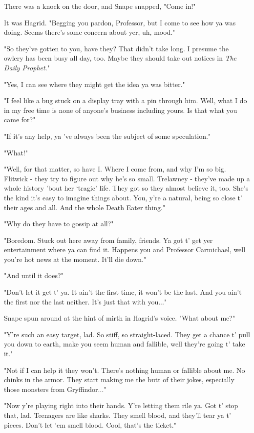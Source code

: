 \documentclass[a4paper,11pt]{article}
\begin{document}
There was a knock on the door, and Snape snapped, "Come in!"

It was Hagrid. "Begging you pardon, Professor, but I come to see how ya was doing. Seems there's some concern about yer, uh, mood."

"So they've gotten to you, have they? That didn't take long. I presume the owlery has been busy all day, too. Maybe they should take out notices in \emph{The Daily Prophet}."

"Yes, I can see where they might get the idea ya was bitter."

"I feel like a bug stuck on a display tray with a pin through him. Well, what I do in my free time is none of anyone's business including yours. Is that what you came for?"

"If it's any help, ya 've always been the subject of some speculation."

"What!"

"Well, for that matter, so have I. Where I come from, and why I'm so big. Flitwick - they try to figure out why he's so small. Trelawney - they've made up a whole history 'bout her `tragic' life. They got so they almost believe it, too. She's the kind it's easy to imagine things about. You, y're a natural, being so close t' their ages and all. And the whole Death Eater thing."

"Why do they have to gossip at all?"

"Boredom. Stuck out here away from family, friends. Ya got t' get yer entertainment where ya can find it. Happens you and Professor Carmichael, well you're hot news at the moment. It'll die down."

"And until it does?"

"Don't let it get t' ya. It ain't the first time, it won't be the last. And you ain't the first nor the last neither. It's just that with you..."

Snape spun around at the hint of mirth in Hagrid's voice. "What about me?"

"Y're such an easy target, lad. So stiff, so straight-laced. They get a chance t' pull you down to earth, make you seem human and fallible, well they're going t' take it."

"Not if I can help it they won't. There's nothing human or fallible about me. No chinks in the armor. They start making me the butt of their jokes, especially those monsters from Gryffindor..."

"Now y're playing right into their hands. Y're letting them rile ya. Got t' stop that, lad. Teenagers are like sharks. They smell blood, and they'll tear ya t' pieces. Don't let 'em smell blood. Cool, that's the ticket."
\end{document}
